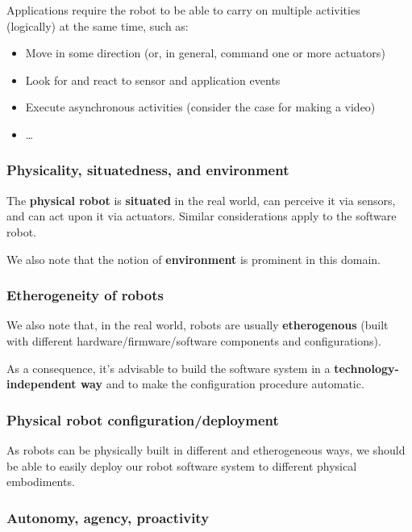 \documentclass[11pt]{article}
\begin{document}
  Applications require the robot to be able to carry on multiple activities
  (logically) at the same time, such as:
  
\begin{itemize}
  \item Move in some direction (or, in general, command one or more actuators)
  \item Look for and react to sensor and application events
  \item Execute asynchronous activities (consider the case for making a video)
  \item \ldots
\end{itemize}
  

\subsubsection{Physicality, situatedness, and environment}

The \textbf{physical robot} is \textbf{situated} in the real world, can perceive
it via sensors, and can act upon it via actuators. Similar considerations apply
to the software robot. 

We also note that the notion of \textbf{environment} is prominent
in this domain.


\subsubsection{Etherogeneity of robots}

We also note that, in the real world, robots are usually
\textbf{etherogenous} (built with different hardware/firmware/software
components and configurations). 

As a consequence, it's advisable to build the software system in a
\textbf{technology-independent way} and to make the configuration procedure
automatic.

 
\subsubsection{Physical robot configuration/deployment}

As robots can be physically built in different and etherogeneous ways, 
 we should be able to easily deploy our robot software system to different
 physical embodiments.


\subsubsection{Autonomy, agency, proactivity} 
 
\end{document}
